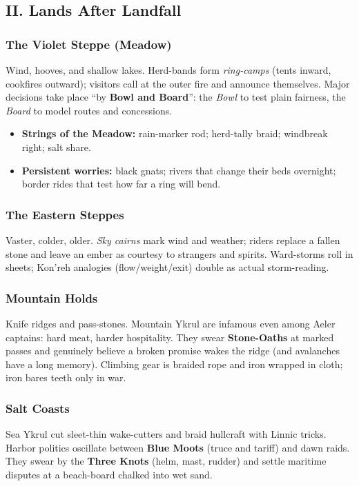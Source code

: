\documentclass[11pt,letterpaper]{article}
\begin{document}
\subsection{II. Lands After Landfall}

\subsubsection*{The Violet Steppe (Meadow)}
Wind, hooves, and shallow lakes. Herd-bands form \emph{ring-camps} (tents inward, cookfires outward); visitors call at the outer fire and announce themselves. Major decisions take place ``by \textbf{Bowl and Board}'': the \emph{Bowl} to test plain fairness, the \emph{Board} to model routes and concessions.
\begin{itemize}[leftmargin=*]
  \item \textbf{Strings of the Meadow:} rain-marker rod; herd-tally braid; windbreak right; salt share.
  \item \textbf{Persistent worries:} black gnats; rivers that change their beds overnight; border rides that test how far a ring will bend.
\end{itemize}

\subsubsection*{The Eastern Steppes}
Vaster, colder, older. \emph{Sky cairns} mark wind and weather; riders replace a fallen stone and leave an ember as courtesy to strangers and spirits. Ward-storms roll in sheets; Kon'reh analogies (flow/weight/exit) double as actual storm-reading.

\subsubsection*{Mountain Holds}
Knife ridges and pass-stones. Mountain Ykrul are infamous even among Aeler captains: hard meat, harder hospitality. They swear \textbf{Stone-Oaths} at marked passes and genuinely believe a broken promise wakes the ridge (and avalanches have a long memory). Climbing gear is braided rope and iron wrapped in cloth; iron bares teeth only in war.

\subsubsection*{Salt Coasts}
Sea Ykrul cut sleet-thin wake-cutters and braid hullcraft with Linnic tricks. Harbor politics oscillate between \textbf{Blue Moots} (truce and tariff) and dawn raids. They swear by the \textbf{Three Knots} (helm, mast, rudder) and settle maritime disputes at a beach-board chalked into wet sand.
\end{document}

